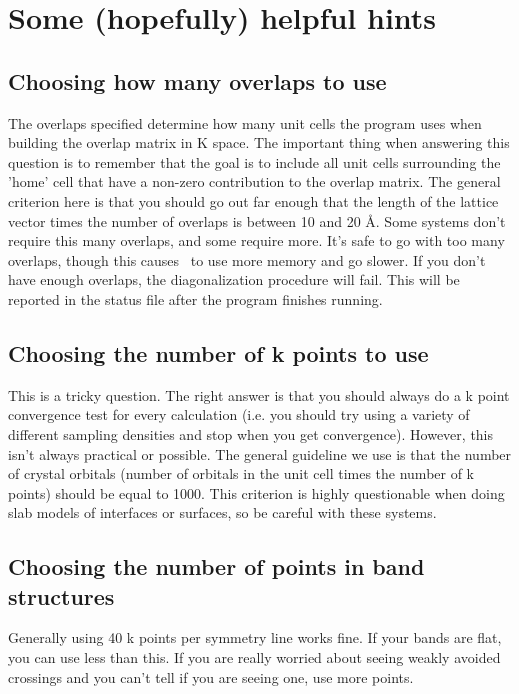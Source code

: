 \chapter{ Some (hopefully) helpful hints}

\section{Choosing how many overlaps to use}

The overlaps specified determine how many unit cells the program
uses when building the overlap matrix in K space.
The important thing when answering this question is to remember that
the goal is to include all unit cells surrounding the 'home' cell 
that have a non-zero contribution to the overlap
matrix. The general criterion here is that you should
go out far enough that the length of the lattice vector times the
number of overlaps is between 10 and 20 \AA.  Some systems don't
require this many overlaps, and some require more.  It's safe to go
with too many overlaps, though this causes \calcprog\ to use more
memory and go slower.  If you don't have enough overlaps, the
diagonalization procedure will fail.  This will be reported in the
status file after the program finishes running.


\section{Choosing the number of k points to use}

This is a tricky question.  The right answer is that you should always
do a k point convergence test for every calculation (i.e. you should
try using a variety of different sampling densities and stop when you
get convergence).   However, this isn't always practical or possible.
The general guideline we use is that the number of crystal orbitals
(number of orbitals in the unit cell times the number of k points)
should be equal to 1000.  This criterion is highly questionable when
doing slab models of interfaces or surfaces, so be careful with these
systems.

\section{Choosing the number of points in band structures}

Generally using 40 k points per symmetry line works fine.  If your
bands are flat, you can use less than this.  If you are really worried
about seeing weakly avoided crossings and you can't tell if you are
seeing one, use more points.



